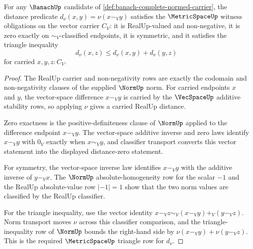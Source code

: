 \begin{theorem}
\label{thm:banach-metric-induced-by-norm}
For any $\BanachUp$ candidate of
\autoref{def:banach-complete-normed-carrier}, the distance predicate
$d_\nu(x,y)=\nu(x-_V y)$ satisfies the $\MetricSpaceUp$ witness obligations on
the vector carrier $C_V$: it is RealUp-valued and non-negative, it is zero
exactly on $\sim_V$-classified endpoints, it is symmetric, and it satisfies the
triangle inequality
$$
d_\nu(x,z)\le d_\nu(x,y)+d_\nu(y,z)
$$
for carried $x,y,z:C_V$.
\end{theorem}
\begin{proof}
The RealUp carrier and non-negativity rows are exactly the codomain and
non-negativity clauses of the supplied $\NormUp$ norm. For carried endpoints
$x$ and $y$, the vector-space difference $x-_V y$ is carried by the
$\VecSpaceUp$ additive stability rows, so applying $\nu$ gives a carried
RealUp distance.

Zero exactness is the positive-definiteness clause of $\NormUp$ applied to the
difference endpoint $x-_V y$. The vector-space additive inverse and zero laws
identify $x-_V y$ with $0_V$ exactly when $x\sim_V y$, and classifier transport
converts this vector statement into the displayed distance-zero statement.

For symmetry, the vector-space inverse law identifies $x-_V y$ with the
additive inverse of $y-_V x$. The $\NormUp$ absolute-homogeneity row for the
scalar $-1$ and the RealUp absolute-value row $|-1|=1$ show that the two norm
values are classified by the RealUp classifier.

For the triangle inequality, use the vector identity
$x-_V z\sim_V (x-_V y)+_V(y-_V z)$. Norm transport moves $\nu$ across this
classifier comparison, and the triangle-inequality row of $\NormUp$ bounds the
right-hand side by $\nu(x-_V y)+\nu(y-_V z)$. This is the required
$\MetricSpaceUp$ triangle row for $d_\nu$.
\end{proof}

